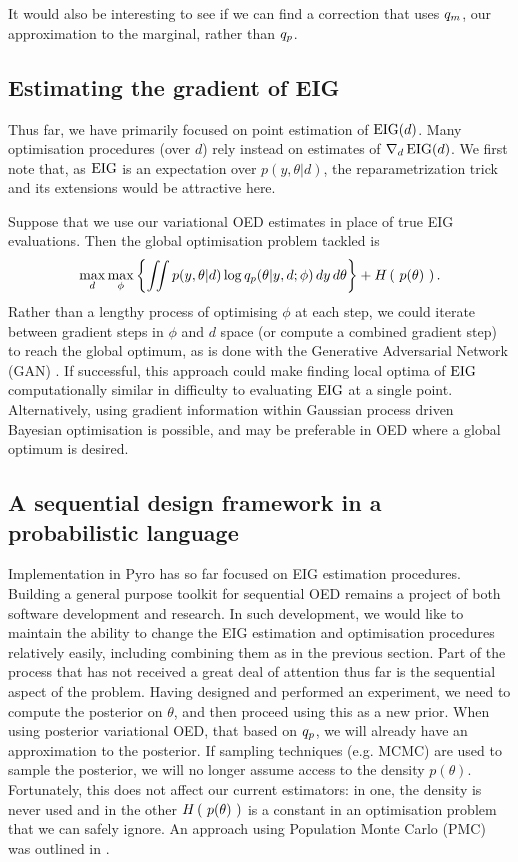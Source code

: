 It would also be interesting to see if we can find a correction that uses $q_m$, our approximation to the marginal, rather than $q_p$.


\subsection{Estimating the gradient of EIG}
Thus far, we have primarily focused on point estimation of $\text{EIG}(d)$. Many optimisation procedures (over $d$) rely instead on estimates of $\nabla_d\,\text{EIG}(d)$. We first note that, as $\text{EIG}$ is an expectation over $p(y,\theta|d)$, the reparametrization trick and its extensions \cite{tucker2017rebar, rezende2014stochastic} would be attractive here.

Suppose that we use our variational OED estimates in place of true EIG evaluations. Then the global optimisation problem tackled is
\begin{equation}
	\max_d \max_\phi \left\{ \iint p(y, \theta | d) \log q_p (\theta | y, d; \phi)\, dy\, d\theta  \right\} + H\left(\ p(\theta)\ \right).
\end{equation}
Rather than a lengthy process of optimising $\phi$ at each step, we could iterate between gradient steps in $\phi$ and $d$ space (or compute a combined gradient step) to reach the global optimum, as is done with the Generative Adversarial Network (GAN) \cite{goodfellow2014generative}. If successful, this approach could make finding local optima of $\text{EIG}$ computationally similar in difficulty to evaluating $\text{EIG}$ at a single point.
Alternatively, using gradient information within Gaussian process driven Bayesian optimisation \cite{osborne2009gaussian} is possible, and may be preferable in OED where a global optimum is desired.

\subsection{A sequential design framework in a probabilistic language}
Implementation in Pyro has so far focused on EIG estimation procedures. Building a general purpose toolkit for sequential OED remains a project of both software development and research. In such development, we would like to maintain the ability to change the EIG estimation and optimisation procedures relatively easily, including combining them as in the previous section. Part of the process that has not received a great deal of attention thus far is the sequential aspect of the problem. Having designed and performed an experiment, we need to compute the posterior on $\theta$, and then proceed using this as a new prior. When using posterior variational OED, that based on $q_p$, we will already have an approximation to the posterior. If sampling techniques (e.g. MCMC) are used to sample the posterior, we will no longer assume access to the density $p(\theta)$. Fortunately, this does not affect our current estimators: in one, the density is never used and in the other $H\left(\ p(\theta)\ \right)$ is a constant in an optimisation problem that we can safely ignore. An approach using Population Monte Carlo (PMC) was outlined in \cite{vincent2017}.


